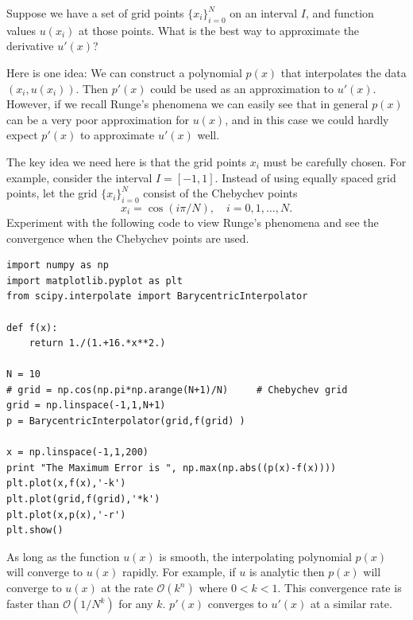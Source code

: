 \label{lab:pseudospectral1}

Suppose we have a set of grid points $\{x_i\}_{i=0}^N$ on an interval $I$, and function values $u(x_i)$ at those points. What is the best way to approximate the derivative $u'(x)$?

Here is one idea: We can construct a polynomial $p(x)$ that interpolates the data $(x_i,u(x_i))$. Then $p'(x)$ could be used as an approximation to $u'(x)$. However, if we recall Runge's phenomena we can easily see that in general $p(x)$ can be a very poor approximation for $u(x)$, and in this case we could hardly expect $p'(x)$ to approximate $u'(x)$ well. 

The key idea we need here is that the grid points $x_i$ must be carefully chosen. For example, consider the interval $I = [-1,1]$. Instead of using equally spaced grid points, let the grid $\{x_i\}_{i=0}^N$ consist of the Chebychev points 
\[x_i = \cos (i \pi /N), \quad i = 0, 1, \ldots, N.\]
Experiment with the following code to view Runge's phenomena and see the convergence when the Chebychev points are used.

\begin{lstlisting}
import numpy as np
import matplotlib.pyplot as plt
from scipy.interpolate import BarycentricInterpolator

def f(x):
	return 1./(1.+16.*x**2.)

N = 10
# grid = np.cos(np.pi*np.arange(N+1)/N)		# Chebychev grid
grid = np.linspace(-1,1,N+1)
p = BarycentricInterpolator(grid,f(grid) )

x = np.linspace(-1,1,200)
print "The Maximum Error is ", np.max(np.abs((p(x)-f(x))))
plt.plot(x,f(x),'-k')
plt.plot(grid,f(grid),'*k')
plt.plot(x,p(x),'-r')
plt.show()
\end{lstlisting}

As long as the function $u(x)$ is smooth, the interpolating polynomial $p(x)$ will converge to $u(x)$ rapidly. For example, if $u$ is analytic then $p(x)$ will converge to $u(x)$ at the rate $\mathcal{O}(k^n)$ where $0<k<1$. This convergence rate is faster than $\mathcal{O}(1/N^k)$ for any $k$. $p'(x)$ converges to $u'(x)$ at a similar rate. 



